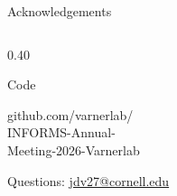 \begin{frame}{Acknowledgements}
\begin{columns}[T,onlytextwidth]
\begin{column}{0.40\textwidth}
\begin{minipage}[t]{0.47\linewidth}
      \end{minipage}\hfill
      \begin{minipage}[t]{0.47\linewidth}
        \centering
        {\small\color{vnslideink}\strut Code}\par\vspace{0.5em}
        \colorbox{vnbg}{}\par\vspace{0.5em}
        {\fontsize{7}{8.4}\selectfont\color{vnquiet} github.com/varnerlab/\\INFORMS-Annual-\\Meeting-2026-Varnerlab\par}
      \end{minipage}\par
      \vspace{1.0em}
      {\small\color{vnslideink} Questions: \href{mailto:jdv27@cornell.edu}{jdv27@cornell.edu}\par}
    \end{column}
  \end{columns}
\end{frame}

